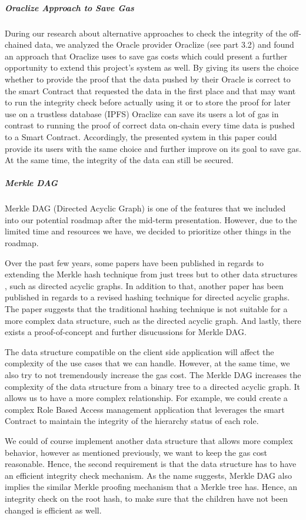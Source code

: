 \subparagraph{Oraclize Approach to Save Gas}
During our research about alternative approaches to check the integrity of the off-chained data, we analyzed the Oracle provider Oraclize (see part 3.2) and found an approach that Oraclize uses to save gas costs which could present a further opportunity to extend this project’s system as well. By giving its users the choice whether to provide the proof that the data pushed by their Oracle is correct to the smart Contract that requested the data in the first place and that may want to run the integrity check before actually using it or to store the proof for later use on a trustless database (IPFS) Oraclize can save its users a lot of gas in contrast to running the proof of correct data on-chain every time data is pushed to a Smart Contract. Accordingly, the presented system in this paper could provide its users with the same choice and further improve on its goal to save gas. At the same time, the integrity of the data can still be secured.

\subparagraph{Merkle DAG}
Merkle DAG (Directed Acyclic Graph) is one of the features that we included into our potential roadmap after the mid-term presentation. However, due to the limited time and resources we have, we decided to prioritize other things in the roadmap.

Over the past few years, some papers have been published in regards to extending the Merkle hash technique from just trees but to other data structures \cite{Martel2004}, such as directed acyclic graphs. In addition to that, another paper has been published in regards to a revised hashing technique \cite{kundu2012hashing} for directed acyclic graphs. The paper suggests that the traditional hashing technique is not suitable for a more complex data structure, such as the directed acyclic graph. And lastly, there exists a proof-of-concept \cite{futureWork02} and further disucussions for Merkle DAG.

The data structure compatible on the client side application will affect the complexity of the use cases that we can handle. However, at the same time, we also try to not tremendously increase the gas cost. The Merkle DAG increases the complexity of the data structure from a binary tree to a directed acyclic graph. It allows us to have a more complex relationship. For example, we could create a complex Role Based Access management application that leverages the smart Contract to maintain the integrity of the hierarchy status of each role.

We could of course implement another data structure that allows more complex behavior, however as mentioned previously, we want to keep the gas cost reasonable. Hence, the second requirement is that the data structure has to have an efficient integrity check mechanism. As the name suggests, Merkle DAG also implies the similar Merkle proofing mechanism that a Merkle tree has. Hence, an integrity check on the root hash, to make sure that the children have not been changed is efficient as well.

